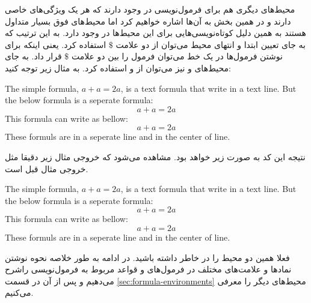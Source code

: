 محیط‌های دیگری هم برای فرمول‌نویسی در \lr{\LaTeX} وجود دارند که هر یک ویژگی‌های
خاصی دارند و در همین بخش به آن‌ها اشاره خواهیم کرد اما محیط‌های فوق بسیار متداول
هستند به همین دلیل کوتاه‌نویسی‌هایی برای این محیط‌ها در \lr{\LaTeX} وجود دارد.
به این ترتیب که به جای تعیین ابتدا و انتهای محیط  می‌توان از دو علامت
$\$$ استفاده کرد. یعنی اینکه برای نوشتن فرمول‌ها در یک خط می‌توان فرمول را بین
دو علامت $\$$ قرار داد. به جای محیط‌های  و  نیز
می‌توان از \lr{\textbackslash [} و \lr{\textbackslash ]} استفاده کرد. به مثال
زیر توجه کنید:

\begin{latex}
The simple formula, $a+a=2a$, is a text formula that write
in a text line. But the below formula is a seperate formula:
\[
a+a=2a
\]
This formula can write as bellow:
\[
a+a=2a
\]
These formuls are in a seperate line and in the center of line.
\end{latex}

نتیجه این کد \lr{\LaTeX} به صورت زیر خواهد بود. مشاهده می‌شود که خروجی مثال زیر
دقیقا مثل خروجی مثال قبل است.

\begin{latin}
The simple formula, $a+a=2a$, is a text formula that write
in a text line. But the below formula is a seperate formula:
\[
a+a=2a
\]
This formula can write as bellow:
\[
a+a=2a
\]
These formuls are in a seperate line and in the center of line.
\end{latin}

فعلا همین دو محیط را در خاطر داشته باشید. در ادامه به طور خلاصه نحوه نوشتن
نمادها و علامت‌های مختلف در فرمول‌‌های \lr{\LaTeX} و قواعد مربوط به فرمول‌نویسی
راشرح می‌دهیم و پس از آن در قسمت \ref{sec:formula-environments} محیط‌های دیگر را
معرفی می‌کنیم.

